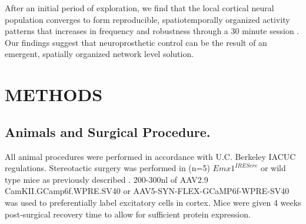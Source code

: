 \documentclass[letterpaper, 10 pt, conference]{ieeeconf}  %
\begin{document}
After an initial period of exploration, we find that the local cortical neural population converges to form reproducible, spatiotemporally organized activity patterns that increases in frequency and robustness through a 30 minute session \cite{Clancy2014-ju,Prsa2017-rn}. Our findings suggest that neuroprosthetic control can be the result of an emergent, spatially organized network level solution.





\section{METHODS}
\subsection{Animals and Surgical Procedure.}
All animal procedures were performed in accordance with U.C. Berkeley IACUC regulations. Stereotactic surgery was performed in (n=5)  $Emx1^{IRES cre }$ or wild type mice as previously described \cite{Clancy2014-ju}. 200-300nl of AAV2.9 CamKII.GCamp6f.WPRE.SV40 or AAV5-SYN-FLEX-GCaMP6f-WPRE-SV40 was used to preferentially label excitatory cells in cortex. Mice were given 4 weeks post-surgical recovery time to allow for sufficient protein expression.
\end{document}
